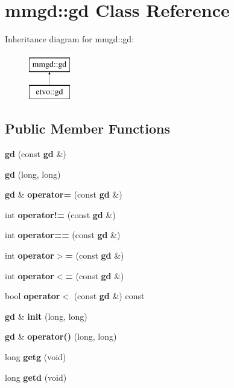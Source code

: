 \section{mmgd\+:\+:gd Class Reference}
\label{classmmgd_1_1gd}
Inheritance diagram for mmgd\+:\+:gd\+:\begin{figure}[H]
\begin{center}
\leavevmode
\includegraphics[height=2.000000cm]{classmmgd_1_1gd}
\end{center}
\end{figure}
\subsection*{Public Member Functions}
\begin{DoxyCompactItemize}
\item 
\mbox{\label{classmmgd_1_1gd_ac8e74872b52997c0aa6090b82d721e08}} 
{\bfseries gd} (const \textbf{ gd} \&)
\item 
\mbox{\label{classmmgd_1_1gd_a512d9003aff50f7b7d2185d7e7272ac6}} 
{\bfseries gd} (long, long)
\item 
\mbox{\label{classmmgd_1_1gd_ab8efdcce657a4f7c28a2bfa5fe9e1836}} 
\textbf{ gd} \& {\bfseries operator=} (const \textbf{ gd} \&)
\item 
\mbox{\label{classmmgd_1_1gd_aceb773d2d343c2c0b9a14f6030d0ac62}} 
int {\bfseries operator!=} (const \textbf{ gd} \&)
\item 
\mbox{\label{classmmgd_1_1gd_a4ff3fb6e099001641de565a933d4d898}} 
int {\bfseries operator==} (const \textbf{ gd} \&)
\item 
\mbox{\label{classmmgd_1_1gd_acfc56cfcff1288f8f4b6120394e7548f}} 
int {\bfseries operator$>$=} (const \textbf{ gd} \&)
\item 
\mbox{\label{classmmgd_1_1gd_a3e38156b0cf3e7cd0a22ba765b874e26}} 
int {\bfseries operator$<$=} (const \textbf{ gd} \&)
\item 
\mbox{\label{classmmgd_1_1gd_a89fc335c8bfe23cef630b06e8f1ae507}} 
bool {\bfseries operator$<$} (const \textbf{ gd} \&) const
\item 
\mbox{\label{classmmgd_1_1gd_a3bb83bc177bb81c2d4cc0f8f5f62f34e}} 
\textbf{ gd} \& {\bfseries init} (long, long)
\item 
\mbox{\label{classmmgd_1_1gd_ac3dadaeb8b427f06d44a34910c9bcb0f}} 
\textbf{ gd} \& {\bfseries operator()} (long, long)
\item 
\mbox{\label{classmmgd_1_1gd_ab452d60ee78b36d09dda2f587f908ce6}} 
long {\bfseries getg} (void)
\item 
\mbox{\label{classmmgd_1_1gd_af0875481e5b2d5de2f9a2e8a8500aa05}} 
long {\bfseries getd} (void)
\end{DoxyCompactItemize}
